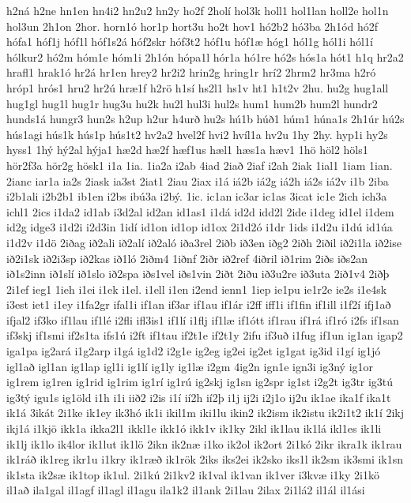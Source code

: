 {h2ná
h2ne
hn1en
hn4i2
hn2u2
hn2y
ho2f
2holí
hol3k
holl1
hol1lan
holl2e
hol1n
hol3un
2h1on
2hor.
horn1ó
hor1p
hort3u
ho2t
hov1
hó2b2
hó3ba
2h1ód
hó2f
hófa1
hóf1j
hóf1l
hóf1s2á
hóf2skr
hóf3t2
hóf1u
hóf1æ
hóg1
hól1g
hól1i
hól1í
hólkur2
hó2m
hóm1e
hóm1i
2h1ón
hópa1l
hór1a
hó1re
hó2s
hós1a
hót1
h1q
hr2a2
hrafl1
hrak1ó
hr2á
hr1en
hrey2
hr2i2
hrin2g
hring1r
hrí2
2hrm2
hr3ma
h2ró
hróp1
hrós1
hru2
hr2ú
hræ1f
h2rö
h1sí
hs2l1
hs1v
ht1
h1t2v
2hu.
hu2g
hug1all
hug1gl
hug1l
hug1r
hug3u
hu2k
hu2l
hul3i
hul2s
hum1
hum2b
hum2l
hundr2
hunds1á
hungr3
hun2s
h2up
h2ur
h4urð
hu2s
hú1b
húð1
húm1
húna1s
2h1úr
hú2s
hús1agi
hús1k
hús1p
hús1t2
hv2a2
hvel2f
hvi2
hvíl1a
hv2u
1hy
2hy.
hyp1i
hy2s
hyss1
1hý
hý2al
hýja1
hæ2d
hæ2f
hæf1us
hæl1
hæs1a
hæv1
1hö
höl2
höls1
hör2f3a
hör2g
hösk1
i1a
1ia.
1ia2a
i2ab
4iad
2iað
2iaf
i2ah
2iak
1ial1
1iam
1ian.
2ianc
iar1a
ia2s
2iask
ia3st
2iat1
2iau
2iax
i1á
iá2b
iá2g
iá2h
iá2s
iá2v
i1b
2iba
i2b1ali
i2b2b1
ib1en
i2bs
ibú3a
i2bý.
1ic.
ic1an
ic3ar
ic1as
3icat
ic1e
2ich
ich3a
ichl1
2ics
i1da2
id1ab
i3d2al
id2an
id1as1
i1dá
id2d
idd2l
2ide
i1deg
id1el
i1dem
id2g
idge3
i1d2i
i2d3in
1idí
id1on
id1op
id1ox
2i1d2ó
i1dr
1ids
i1d2u
i1dú
id1úa
i1d2v
i1dö
2iðag
ið2ali
ið2alí
ið2aló
iða3rel
2iðb
ið3en
iðg2
2iðh
2iðil
ið2i1la
ið2ise
ið2i1sk
ið2i3sp
ið2kas
ið1ló
2iðm4
1iðnf
2iðr
ið2ref
4iðril
ið1rim
2iðs
iðs2an
ið1s2inn
ið1slí
ið1slo
ið2spa
iðs1vel
iðs1vin
2iðt
2iðu
ið3u2re
ið3uta
2ið1v4
2iðþ
2i1ef
ieg1
1ieh
i1ei
i1ek
i1el.
i1ell
i1en
i2end
ienn1
1iep
ie1pu
ie1r2e
ie2s
i1e4sk
i3est
iet1
i1ey
i1fa2gr
ifal1i
if1an
if3ar
if1au
if1ár
i2ff
iff1i
if1fin
if1ill
i1f2í
ifj1að
ifjal2
if3ko
if1lau
if1lé
i2fli
ifl3is1
if1lí
i1flj
if1læ
if1ótt
if1rau
if1rá
if1ró
i2fs
if1san
if3skj
if1smi
if2s1ta
ifs1ú
i2ft
if1tau
if2t1e
if2t1y
2ifu
if3uð
i1fug
if1un
ig1an
igap2
iga1pa
ig2ará
i1g2arp
i1gá
ig1d2
i2g1e
ig2eg
ig2ei
ig2et
ig1gat
ig3id
i1gí
ig1jó
igl1að
igl1an
ig1lap
igl1i
ig1lí
ig1ly
ig1læ
i2gm
4ig2n
ign1e
ign3i
ig3ný
ig1or
ig1rem
ig1ren
ig1rid
ig1rim
ig1rí
ig1rú
ig2skj
ig1sn
ig2spr
ig1st
i2g2t
ig3tr
ig3tú
ig3tý
igu1s
ig1öld
i1h
i1i
iið2
i2is
i1í
ií2h
ií2þ
i1j
ij2i
i2j1o
ij2u
ik1ae
ika1f
ika1t
ik1á
3ikát
2i1ke
ik1ey
ik3hó
ik1i
ikil1m
iki1lu
ikin2
ik2ism
ik2istu
ik2i1t2
ik1í
2ikj
ikj1á
i1kjö
ikk1a
ikka2l1
ikkl1e
ikk1ó
ikk1v
ik1ky
2ikl
ik1lau
ik1lá
ikl1es
ik1li
ik1lj
ik1lo
ik4lor
ik1lut
ik1lö
2ikn
ik2næ
i1ko
ik2ol
ik2ort
2i1kó
2ikr
ikra1k
ik1rau
ik1ráð
ik1reg
ikr1u
i1kry
ik1ræð
ik1rök
2iks
iks2ei
ik2sko
iks1l
ik2sm
ik3smi
ik1sn
ik1sta
ik2sæ
ik1top
ik1ul.
2i1kú
2i1kv2
ik1val
ik1van
ik1ver
i3kvæ
i1ky
2i1kö
il1að
ila1gal
il1agf
il1agl
il1agu
ila1k2
il1ank
2i1lau
2ilax
2i1lá2
il1ál
il1ási
}
